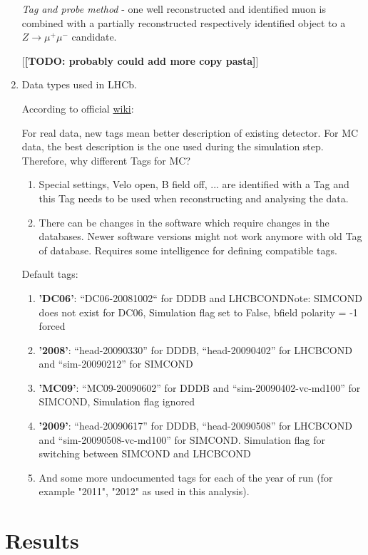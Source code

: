 \documentclass[11pt,a4paper,twoside]{article}
\begin{document}
\begin{enumerate}
        


        \textit{Tag and probe method} - one well reconstructed and identified muon is combined with a partially reconstructed respectively identified object to a $Z \longrightarrow \mu^{+} \mu^{-}$ candidate.

        [\textbf{[TODO: probably could add more copy pasta]}]

        \item Data types used in LHCb.

        According to official \hyperlink{https://twiki.cern.ch/twiki/bin/view/LHCb/RecommendedTags}{wiki}:

        For real data, new tags mean better description of existing detector. For MC data, the best description is the one used during the simulation step. Therefore, why different Tags for MC?

        \begin{enumerate}
            \item Special settings, Velo open, B field off, ... are identified with a Tag and this Tag needs to be used when reconstructing and analysing the data.
            \item There can be changes in the software which require changes in the databases. Newer software versions might not work anymore with old Tag of database. Requires some intelligence for defining compatible tags.
        \end{enumerate}


        Default tags:
        \begin{enumerate}
            \item \textbf{'DC06'}: “DC06-20081002“ for DDDB and LHCBCONDNote: SIMCOND does not exist for DC06, Simulation flag set to False, bfield polarity = -1 forced
            \item \textbf{'2008'}: “head-20090330” for DDDB, “head-20090402” for LHCBCOND and “sim-20090212” for SIMCOND
            \item \textbf{'MC09'}: “MC09-20090602” for DDDB and “sim-20090402-vc-md100” for SIMCOND, Simulation flag ignored
            \item \textbf{'2009'}: “head-20090617” for DDDB, “head-20090508” for LHCBCOND and “sim-20090508-vc-md100” for SIMCOND. Simulation flag for switching between SIMCOND and LHCBCOND
            \item And some more undocumented tags for each of the year of run (for example "2011", "2012" as used in this analysis).
        \end{enumerate}

        
    \end{enumerate}


\section{Results}
    
\singlespacing
	
	


	
\end{document}
